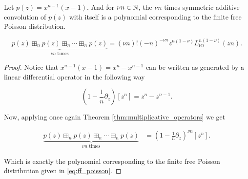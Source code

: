\begin{theorem}
    Let $p(z) = x^{n-1}(x-1)$. And for $\nu n \in \mathbb N$, the $\nu n$ times symmetric additive convolution of $p(z)$ with itself is a polynomial corresponding to the finite free Poisson distribution.

    \begin{equation*}
        \underbrace{p(z) \boxplus_n p(z) \boxplus_n \cdots \boxplus_n p(z)}_\text{$\nu n$ times} = (\nu n)!(-n)^{-\nu n}z^{n(1-\nu)}L_{\nu n}^{n(1-\nu)}(zn).
    \end{equation*}
\end{theorem}

\begin{proof}
    Notice that $x^{n-1}(x-1) = x^n - x^{n-1}$ can be written as generated by a linear differential operator in the following way

    \begin{equation*}
        \left(1 - \frac1n \partial_z\right)[z^n] = z^n - z^{n-1}.
    \end{equation*}

    Now, applying once again Theorem \ref*{thm:multiplicative_operators} we get

    \begin{align*}
        \underbrace{p(z) \boxplus_n p(z) \boxplus_n \cdots \boxplus_n p(z)}_\text{$\nu n$ times} &= \left(1-\frac1n \partial_z \right)^{\nu n}[z^n].
    \end{align*}

    Which is exactly the polynomial corresponding to the finite free Poisson distribution given in  \eqref{eq:ff_poisson}.
\end{proof}